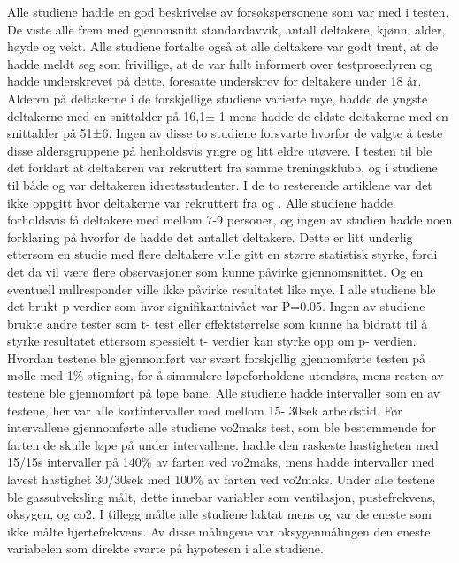 \documentclass[
]{book}
\begin{document}
Alle studiene hadde en god beskrivelse av forsøkspersonene som var med i testen. De viste alle frem med gjenomsnitt standardavvik, antall deltakere, kjønn, alder, høyde og vekt. Alle studiene fortalte også at alle deltakere var godt trent, at de hadde meldt seg som frivillige, at de var fullt informert over testprosedyren og hadde underskrevet på dette, foresatte underskrev for deltakere under 18 år. Alderen på deltakerne i de forskjellige studiene varierte mye, \citet{thevenet2007a} hadde de yngste deltakerne med en snittalder på 16,1± 1 mens \citet{billat2001} hadde de eldste deltakerne med en snittalder på 51±6. Ingen av disse to studiene forsvarte hvorfor de valgte å teste disse aldersgruppene på henholdsvis yngre og litt eldre utøvere.
I testen til \citet{thevenet2007} ble det forklart at deltakeren var rekruttert fra samme treningsklubb, og i studiene til både \citet{dupont2002} og \citet{wakefield2009} var deltakeren idrettsstudenter. I de to resterende artiklene var det ikke oppgitt hvor deltakerne var rekruttert fra \citet{billat2001} og \citet{billat2000}. Alle studiene hadde forholdsvis få deltakere med mellom 7-9 personer, og ingen av studien hadde noen forklaring på hvorfor de hadde det antallet deltakere. Dette er litt underlig ettersom en studie med flere deltakere ville gitt en større statistisk styrke, fordi det da vil være flere observasjoner som kunne påvirke gjennomsnittet. Og en eventuell nullresponder ville ikke påvirke resultatet like mye.
I alle studiene ble det brukt p-verdier som hvor signifikantnivået var P=0.05. Ingen av studiene brukte andre tester som t- test eller effektstørrelse som kunne ha bidratt til å styrke resultatet ettersom spessielt t- verdier kan styrke opp om p- verdien. Hvordan testene ble gjennomført var svært forskjellig \citet{wakefield2009} gjennomførte testen på mølle med 1\% stigning, for å simmulere løpeforholdene utendørs, mens resten av testene ble gjennomført på løpe bane. Alle studiene hadde intervaller som en av testene, her var alle kortintervaller med mellom 15- 30sek arbeidstid. Før intervallene gjennomførte alle studiene vo2maks test, som ble bestemmende for farten de skulle løpe på under intervallene. \citet{dupont2002} hadde den raskeste hastigheten med 15/15s intervaller på 140\% av farten ved vo2maks, mens \citet{thevenet2007} hadde intervaller med lavest hastighet 30/30sek med 100\% av farten ved vo2maks. Under alle testene ble gassutveksling målt, dette innebar variabler som ventilasjon, pustefrekvens, oksygen, og co2. I tillegg målte alle studiene laktat mens \citet{billat2001} og \citet{billat2000} var de eneste som ikke målte hjertefrekvens. Av disse målingene var oksygenmålingen den eneste variabelen som direkte svarte på hypotesen i alle studiene.
\end{document}
